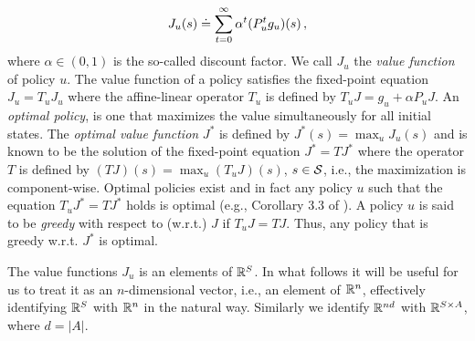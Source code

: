 \documentclass[twocolumn]{IEEEtran}
\begin{document}
\begin{align}
J_u(s)\defeq \sum_{t=0}^\infty \alpha^t (P_u^t g_u)(s)\,,\nn
\end{align}
where  $\alpha \in (0,1)$ is the so-called discount factor. %
We call $J_u$ the \emph{value function} of policy $u$. The value function of a policy satisfies the fixed-point equation $J_u = T_u J_u$ where the affine-linear operator $T_u$ is defined by $T_u J = g_u + \alpha P_u J$.
An \emph{optimal policy}, is one that maximizes the value simultaneously for all initial states.
The \emph{optimal value function} $J^*$ is defined by $J^*(s) = \max_u J_u(s)$ and is known to be the solution of the fixed-point equation $J^* = T J^*$ where the operator $T$ is defined by $(TJ)(s) = \max_u (T_u J)(s)$, $s\in \S$, i.e., the maximization is component-wise. Optimal policies exist and in fact any policy $u$ such that the equation $T_u J^* = T J^*$ holds is optimal (e.g., Corollary 3.3 of \cite{Kall17}). A policy $u$ is said to be \emph{greedy} with respect to (w.r.t.) $J$ if $T_u J = T J$. Thus, any policy that is greedy w.r.t. $J^*$ is optimal.

The value functions $J_u$ is an elements of $\R^S$. In what follows it will be useful for us to treat it as an $n$-dimensional vector, i.e., an element of $\R^n$, effectively identifying $\R^S$ with $\R^n$ in the natural way. Similarly we identify $\R^{nd}$ with $\R^{S\times A}$, where $d=|A|$.
\end{document}
